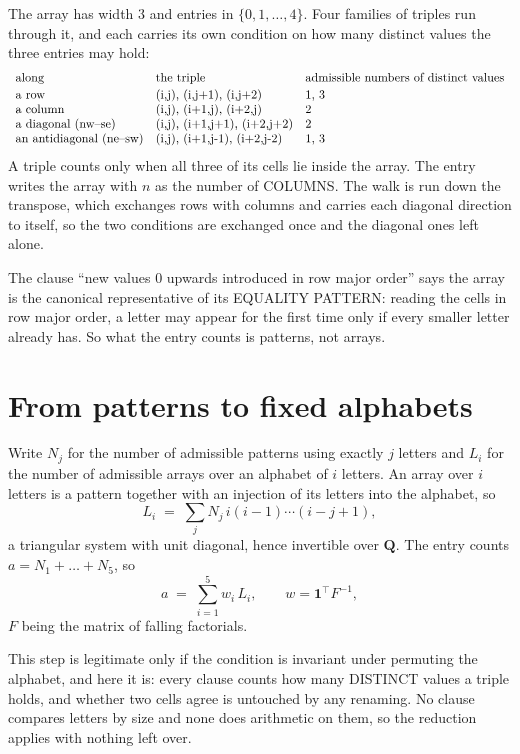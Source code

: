 \documentclass[11pt,a4paper]{article}
\theoremstyle{plain}
\theoremstyle{definition}
\begin{document}
The array has width $3$ and entries in $\{0,1,\dots,4\}$. Four families of triples
run through it, and each carries its own condition on how many distinct values the three
entries may hold:
\[
\begin{array}{lll}
\text{along} & \text{the triple} & \text{admissible numbers of distinct values} \\[2pt]
\text{a row} & $(i,j),\ (i,j+1),\ (i,j+2)$ & $1, 3$ \\
\text{a column} & $(i,j),\ (i+1,j),\ (i+2,j)$ & $2$ \\
\text{a diagonal (nw--se)} & $(i,j),\ (i+1,j+1),\ (i+2,j+2)$ & $2$ \\
\text{an antidiagonal (ne--sw)} & $(i,j),\ (i+1,j-1),\ (i+2,j-2)$ & $1, 3$ \\
\end{array}
\]
A triple counts only when all three of its cells lie inside the array. The entry writes the array with $n$ as the number of COLUMNS. The walk is run down the transpose, which exchanges rows with columns and carries each diagonal direction to itself, so the two conditions are exchanged once and the diagonal ones left alone.

The clause ``new values $0$ upwards introduced in row major order'' says the array is the
canonical representative of its EQUALITY PATTERN: reading the cells in row major order, a
letter may appear for the first time only if every smaller letter already has. So what the
entry counts is patterns, not arrays.

\section{From patterns to fixed alphabets}

Write $N_j$ for the number of admissible patterns using exactly $j$ letters and $L_i$ for the
number of admissible arrays over an alphabet of $i$ letters. An array over $i$ letters is a
pattern together with an injection of its letters into the alphabet, so
\[
L_i\;=\;\sum_j N_j\,i(i-1)\cdots(i-j+1),
\]
a triangular system with unit diagonal, hence invertible over $\mathbf{Q}$. The entry counts
$a=N_1+\dots+N_{5}$, so
\[
a\;=\;\sum_{i=1}^{5}w_i\,L_i ,\qquad w=\mathbf{1}^{\!\top}F^{-1},
\]
$F$ being the matrix of falling factorials.

This step is legitimate only if the condition is invariant under permuting the alphabet, and
here it is: every clause counts how many DISTINCT values a triple holds, and whether two cells
agree is untouched by any renaming. No clause compares letters by size and none does arithmetic
on them, so the reduction applies with nothing left over.
\end{document}
